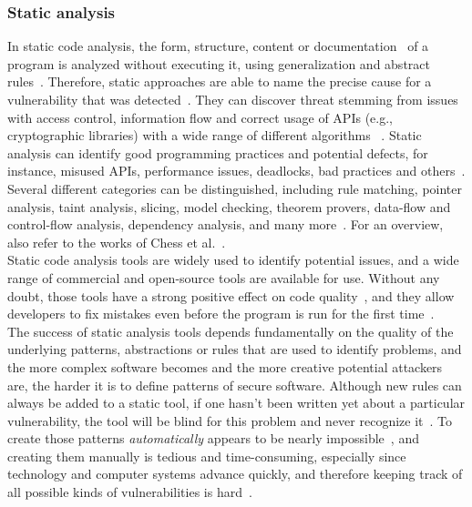\documentclass[
a4paper,
pagesize,
pdftex,
12pt,
twoside, %
BCOR=5mm, %
ngerman,
fleqn,
final,
]{scrartcl}
\begin{document}
	\subsubsection{Static analysis}
	In static code analysis, the form, structure, content or documentation~\cite{Liu.2012} of a program is analyzed without executing it, using generalization and abstract rules~\cite{Ghaffarian.2017}. Therefore, static approaches are able to name the precise cause for a vulnerability that was detected~\cite{Gupta.2014}. They can discover threat stemming from issues with access control, information flow and correct usage of APIs (e.g., cryptographic libraries) with a wide range of different algorithms ~\cite{Pistoia.2007}. Static analysis can identify good programming practices and potential defects, for instance, misused APIs, performance issues, deadlocks, bad practices and others~\cite{Venkatasubramanyam.2014}. Several different categories can be distinguished, including rule matching, pointer analysis, taint analysis, slicing, model checking, theorem provers, data-flow and control-flow analysis, dependency analysis, and many more~\cite{Gupta.2014,Liu.2012}. For an overview, also refer to the works of Chess et al.~\cite{Chess.2004}.\\
	Static code analysis tools are widely used to identify potential issues, and a wide range of commercial and open-source tools are available for use. Without any doubt, those tools have a strong positive effect on code quality~\cite{Liu.2018}, and they allow developers to fix mistakes even before the program is run for the first time~\cite{Gupta.2014}. \\
	The success of static analysis tools depends fundamentally on the quality of the underlying patterns, abstractions or rules that are used to identify problems, and the more complex software becomes and the more creative potential attackers are, the harder it is to define patterns of secure software. Although new rules can always be added to a static tool, if one hasn't been written yet about a particular vulnerability, the tool will be blind for this problem and never recognize it~\cite{Chess.2004}. To create those patterns \textit{automatically} appears to be nearly impossible~\cite{Rolim.2018, Yamaguchi.2012}, and creating them manually is tedious and time-consuming, especially since technology and computer systems advance quickly, and therefore keeping track of all possible kinds of vulnerabilities is hard~\cite{Ma.2017}.\\
\end{document}
